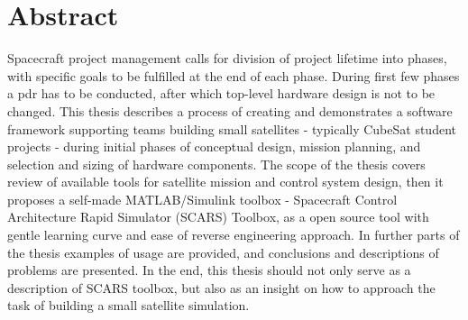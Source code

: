\section*{Abstract}


Spacecraft project management calls for division of project lifetime into phases, with specific goals to be fulfilled at the end of each phase. During first few phases a \ac*{pdr} has to be conducted, after which top-level hardware design is not to be changed. This thesis describes a process of creating and demonstrates a software framework supporting teams building small satellites - typically CubeSat student projects - during initial phases of conceptual design, mission planning, and selection and sizing of hardware components. The scope of the thesis covers review of available tools for satellite mission and control system design, then it proposes a self-made MATLAB/Simulink toolbox - Spacecraft Control Architecture Rapid Simulator (SCARS) Toolbox, as a open source tool with gentle learning curve and ease of reverse engineering approach. In further parts of the thesis examples of usage are provided, and conclusions and descriptions of problems are presented. In the end, this thesis should not only serve as a description of SCARS toolbox, but also as an insight on how to approach the task of building a small satellite simulation.